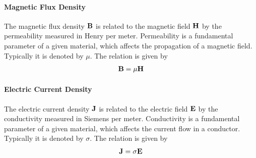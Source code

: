 \paragraph{Magnetic Flux Density} The magnetic flux density $\bold{B}$ is related to the magnetic field $\bold{H}$ by the permeability measured in Henry per meter. Permeability is a fundamental parameter of a given material, which affects the propagation of a magnetic field. Typically it is denoted by $\mu$. The relation is given by \cite{taflove2000computional}
\begin{align}
  \bold{B} = \mu \bold{H}
\end{align}

\paragraph{Electric Current Density}  The electric current density $\bold{J}$ is related to the electric field $\bold{E}$ by the conductivity measured in Siemens per meter. Conductivity is a fundamental parameter of a given material, which affects the current flow in a conductor. Typically it is denoted by $\sigma$. The relation is given by \cite{taflove2000computional}
\begin{align}
  \bold{J} = \sigma \bold{E}
\end{align}


